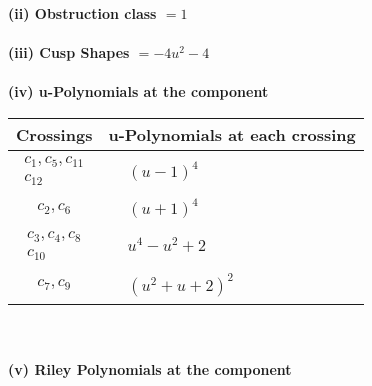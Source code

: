 \documentclass[1p]{elsarticle_modified}
\theoremstyle{definition}
\begin{document}
\flushleft \textbf{(ii) Obstruction class $= 1$}\\~\\
\flushleft \textbf{(iii) Cusp Shapes $= -4 u^2-4$}\\~\\
\newpage\renewcommand{\arraystretch}{1}
\flushleft \textbf{(iv) u-Polynomials at the component}\newline \\
\begin{tabular}{m{50pt}|m{274pt}}
Crossings & \hspace{64pt}u-Polynomials at each crossing \\
\hline $$\begin{aligned}c_{1},c_{5},c_{11}\\c_{12}\end{aligned}$$&$\begin{aligned}
&(u-1)^4
\end{aligned}$\\
\hline $$\begin{aligned}c_{2},c_{6}\end{aligned}$$&$\begin{aligned}
&(u+1)^4
\end{aligned}$\\
\hline $$\begin{aligned}c_{3},c_{4},c_{8}\\c_{10}\end{aligned}$$&$\begin{aligned}
&u^4- u^2+2
\end{aligned}$\\
\hline $$\begin{aligned}c_{7},c_{9}\end{aligned}$$&$\begin{aligned}
&(u^2+u+2)^2
\end{aligned}$\\
\hline
\end{tabular}\\~\\
\newpage\renewcommand{\arraystretch}{1}
\flushleft \textbf{(v) Riley Polynomials at the component}\newline \\
\end{document}
